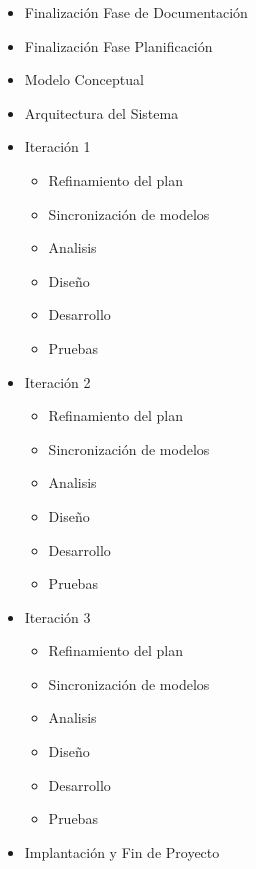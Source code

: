 \begin{itemize}[-]
  \item Finalización Fase de Documentación
  \item Finalización Fase Planificación
  \item Modelo Conceptual
  \item Arquitectura del Sistema
  \item Iteración 1
  \begin{itemize}[-]
    \item Refinamiento del plan
    \item Sincronización de modelos
    \item Analisis
    \item Diseño
    \item Desarrollo
    \item Pruebas
  \end{itemize}
  \item Iteración 2
  \begin{itemize}[-]
    \item Refinamiento del plan
    \item Sincronización de modelos
    \item Analisis
    \item Diseño
    \item Desarrollo
    \item Pruebas
  \end{itemize}
  \item Iteración 3
  \begin{itemize}[-]
    \item Refinamiento del plan
    \item Sincronización de modelos
    \item Analisis
    \item Diseño
    \item Desarrollo
    \item Pruebas
  \end{itemize}
  \item Implantación y Fin de Proyecto
\end{itemize}
 
